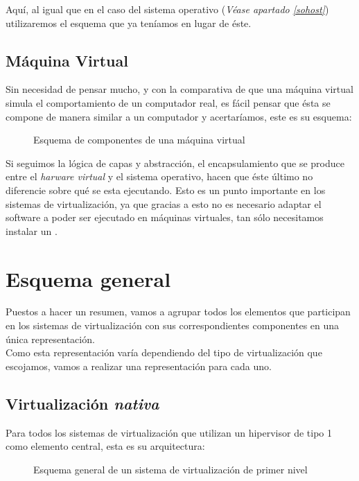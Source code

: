 Aquí, al igual que en el caso del sistema operativo (\textit{Véase apartado \ref{sohost}}) utilizaremos el esquema que ya teníamos en lugar de éste.

\subsection{Máquina Virtual}\label{apartadomaqvir}
Sin necesidad de pensar mucho, y con la comparativa de que una máquina virtual simula el comportamiento de un computador real, es fácil pensar que ésta se compone de manera similar a un computador y acertaríamos, este es su esquema:

\begin{figure}[H]
\begin{center}
\end{center}
\caption[Maquina Virtual]{Esquema de componentes de una máquina virtual}
\end{figure}

Si seguimos la lógica de capas y abstracción, el encapsulamiento que se produce entre el \emph{harware virtual} y el sistema operativo, hacen que éste último no diferencie sobre qué se esta ejecutando. Esto es un punto importante en los sistemas de virtualización, ya que gracias a esto no es necesario adaptar el software a poder ser ejecutado en máquinas virtuales, tan sólo necesitamos instalar un .


\section{Esquema general}
Puestos a hacer un resumen, vamos a agrupar todos los elementos que participan en los sistemas de virtualización con sus correspondientes componentes en una única representación.\\

Como esta representación varía dependiendo del tipo de virtualización que escojamos, vamos a realizar una representación para cada uno.

\subsection{Virtualización \emph{nativa}}
Para todos los sistemas de virtualización que utilizan un hipervisor de tipo 1 como elemento central, esta es su arquitectura:

\begin{figure}[H]
\begin{center}
\end{center}
\caption[Virtualización \emph{nativa}]{Esquema general de un sistema de virtualización de primer nivel}
\end{figure}

